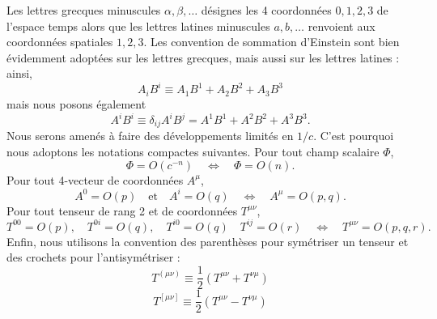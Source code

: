 			Les lettres grecques minuscules $\alpha,\beta,\ldots$ désignes les 4 coordonnées $0,1,2,3$ de l'espace temps alors que les lettres latines minuscules $a,b,\ldots$ renvoient aux coordonnées spatiales $1,2,3$. Les convention de sommation d'Einstein sont bien évidemment adoptées sur les lettres grecques, mais aussi sur les lettres latines : ainsi,
			\begin{equation}
				A_iB^i \equiv A_1B^1 + A_2B^2+A_3B^3
			\end{equation}
			mais nous posons également
			\begin{equation}
				A^iB^i \equiv \delta_{ij}A^iB^j=A^1B^1+A^2B^2+A^3B^3.
			\end{equation}
			Nous serons amenés à faire des développements limités en $1/c$. C'est pourquoi nous adoptons les notations compactes suivantes. Pour tout champ scalaire $\Phi$,
			\begin{equation}
				\Phi = O(c^{-n}) \quad \Leftrightarrow \quad \Phi=O(n).
			\end{equation}
			Pour tout 4-vecteur de coordonnées $A^\mu$,
			\begin{equation}
				A^0=O(p)\quad\text{et}\quad A^i=O(q) \quad \Leftrightarrow \quad A^\mu=O(p,q). 
			\end{equation}
			Pour tout tenseur de rang 2 et de coordonnées $T^{\mu\nu}$,
			\begin{equation}
				T^{00}=O(p), \quad T^{0i}=O(q), \quad T^{i0}=O(q)\quad T^{ij}=O(r) \quad \Leftrightarrow \quad T^{\mu\nu}=O(p,q,r).
			\end{equation}
			Enfin, nous utilisons la convention des parenthèses pour symétriser un tenseur et des crochets pour l'antisymétriser :
			\begin{equation}\label{parent_sym}
				T^{(\mu\nu)}\equiv\frac{1}{2}(T^{\mu\nu}+T^{\nu\mu})
			\end{equation}
			\begin{equation}
				T^{[\mu\nu]}\equiv\frac{1}{2}(T^{\mu\nu}-T^{\nu\mu})
			\end{equation}

